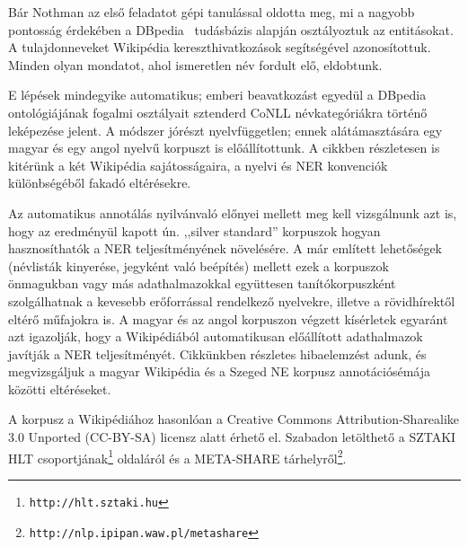 \documentclass{llncs}
\begin{document}
Bár Nothman az első feladatot gépi tanulással oldotta meg, mi a nagyobb
pontosság érdekében a DBpedia~\cite{Bizer:09} tudásbázis alapján osztályoztuk az
entitásokat. A tulajdonneveket Wikipédia kereszthivatkozások segítségével azonosítottuk.
Minden olyan mondatot, ahol ismeretlen név fordult elő, eldobtunk.

E lépések mindegyike automatikus; emberi beavatkozást egyedül a DBpedia ontológiájának
fogalmi osztályait
sztenderd CoNLL névkategóriákra történő leképezése jelent. A módszer jórészt
nyelvfüggetlen; ennek alátámasztására egy magyar és egy angol nyelvű korpuszt is
előállítottunk. A cikkben részletesen is kitérünk a két Wikipédia sajátosságaira, a
nyelvi és NER konvenciók különbségéből fakadó eltérésekre.


Az automatikus annotálás nyilvánvaló előnyei mellett meg kell vizsgálnunk azt is, hogy az
eredményül kapott  ún. ,,silver standard'' korpuszok hogyan hasznosíthatók a NER
teljesítményének növelésére. A már említett lehetőségek (névlisták kinyerése, jegyként
való beépítés) mellett ezek a korpuszok önmagukban vagy más adathalmazokkal együttesen
tanítókorpuszként szolgálhatnak a kevesebb erőforrással rendelkező nyelvekre, illetve a
rövidhírektől eltérő műfajokra is. A magyar és az angol korpuszon végzett kísérletek
egyaránt azt igazolják, hogy a Wikipédiából automatikusan előállított adathalmazok
javítják a NER teljesítményét. Cikkünkben részletes hibaelemzést adunk, és megvizsgáljuk
a magyar Wikipédia és a Szeged NE korpusz\cite{Szarvas:06} annotációsémája közötti
eltéréseket.


A korpusz a Wikipédiához hasonlóan a Creative Commons Attribution-Sharealike
3.0 Unported (CC-BY-SA) licensz alatt érhető el. Szabadon letölthető a SZTAKI HLT
csoportjának\footnote{\texttt{http://hlt.sztaki.hu}} oldaláról és a META-SHARE
tárhelyről\footnote{\texttt{http://nlp.ipipan.waw.pl/metashare}}.


%
%


\end{document}
